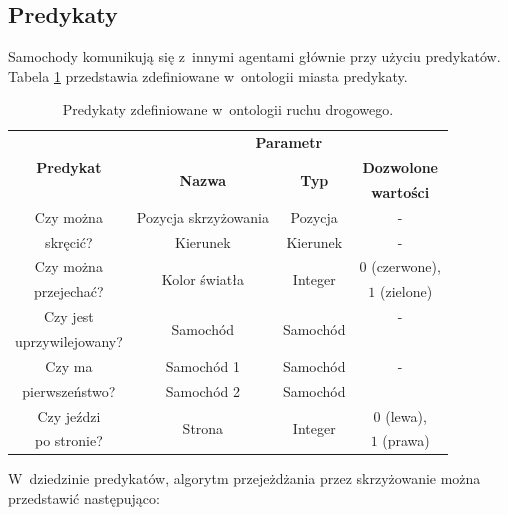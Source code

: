 \documentclass[a4paper,11pt]{article}
\begin{document}
\subsection{Predykaty}
\label{sec:predicates}

Samochody komunikują się z~innymi agentami głównie przy użyciu predykatów. Tabela \ref{tab:predicates} przedstawia zdefiniowane w~ontologii miasta predykaty.

\begin{table}[ht!]
    \centering
    \begin{tabular}{|c|c|c|c|}
        \hline
        \multirow{3}{*}{\textbf{Predykat}} & \multicolumn{3}{|c|}{\textbf{Parametr}} \\
        \cline{2-4}
        & \multirow{2}{*}{\textbf{Nazwa}} & \multirow{2}{*}{\textbf{Typ}} & \textbf{Dozwolone} \\
        &&& \textbf{wartości} \\
        \hline
        Czy można & Pozycja skrzyżowania & Pozycja & - \\
        \cline{2-4}
        skręcić? & Kierunek & Kierunek & - \\
        \hline
        Czy można & \multirow{2}{*}{Kolor światła} & \multirow{2}{*}{Integer} & $0$ (czerwone), \\
        przejechać? &&& $1$ (zielone) \\
        \hline
        Czy jest & \multirow{2}{*}{Samochód} & \multirow{2}{*}{Samochód} & - \\
        uprzywilejowany? &&& \\
        \hline
        Czy ma & Samochód 1 & Samochód & - \\
        \cline{2-4}
        pierwszeństwo? & Samochód 2 & Samochód & \\
        \hline
        Czy jeździ & \multirow{2}{*}{Strona} & \multirow{2}{*}{Integer} & $0$ (lewa), \\
        po stronie? &&& $1$ (prawa) \\
        \hline
    \end{tabular}

    \caption{Predykaty zdefiniowane w~ontologii ruchu drogowego.}
    \label{tab:predicates}
\end{table}

W~dziedzinie predykatów, algorytm przejeżdżania przez skrzyżowanie można przedstawić następująco:
\end{document}
